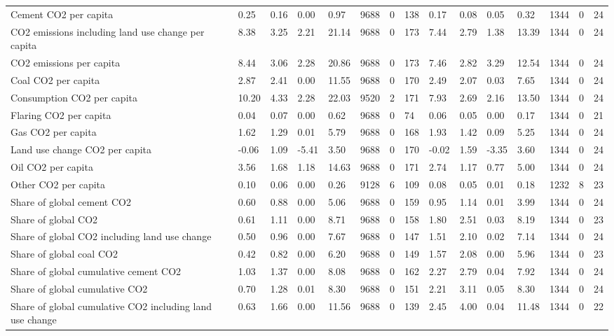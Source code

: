 \begin{longtable}{lllllllllllllll}
Cement CO2 per capita & 0.25 & 0.16 & 0.00 & 0.97 & 9688 & 0 & 138 & 0.17 & 0.08 & 0.05 & 0.32 & 1344 & 0 & 24\\
CO2 emissions including land use change per capita & 8.38 & 3.25 & 2.21 & 21.14 & 9688 & 0 & 173 & 7.44 & 2.79 & 1.38 & 13.39 & 1344 & 0 & 24\\
CO2 emissions per capita & 8.44 & 3.06 & 2.28 & 20.86 & 9688 & 0 & 173 & 7.46 & 2.82 & 3.29 & 12.54 & 1344 & 0 & 24\\
Coal CO2 per capita & 2.87 & 2.41 & 0.00 & 11.55 & 9688 & 0 & 170 & 2.49 & 2.07 & 0.03 & 7.65 & 1344 & 0 & 24\\
\addlinespace
Consumption CO2 per capita & 10.20 & 4.33 & 2.28 & 22.03 & 9520 & 2 & 171 & 7.93 & 2.69 & 2.16 & 13.50 & 1344 & 0 & 24\\
Flaring CO2 per capita & 0.04 & 0.07 & 0.00 & 0.62 & 9688 & 0 & 74 & 0.06 & 0.05 & 0.00 & 0.17 & 1344 & 0 & 21\\
Gas CO2 per capita & 1.62 & 1.29 & 0.01 & 5.79 & 9688 & 0 & 168 & 1.93 & 1.42 & 0.09 & 5.25 & 1344 & 0 & 24\\
Land use change CO2 per capita & -0.06 & 1.09 & -5.41 & 3.50 & 9688 & 0 & 170 & -0.02 & 1.59 & -3.35 & 3.60 & 1344 & 0 & 24\\
Oil CO2 per capita & 3.56 & 1.68 & 1.18 & 14.63 & 9688 & 0 & 171 & 2.74 & 1.17 & 0.77 & 5.00 & 1344 & 0 & 24\\
\addlinespace
Other CO2 per capita & 0.10 & 0.06 & 0.00 & 0.26 & 9128 & 6 & 109 & 0.08 & 0.05 & 0.01 & 0.18 & 1232 & 8 & 23\\
Share of global cement CO2 & 0.60 & 0.88 & 0.00 & 5.06 & 9688 & 0 & 159 & 0.95 & 1.14 & 0.01 & 3.99 & 1344 & 0 & 24\\
Share of global CO2 & 0.61 & 1.11 & 0.00 & 8.71 & 9688 & 0 & 158 & 1.80 & 2.51 & 0.03 & 8.19 & 1344 & 0 & 23\\
Share of global CO2 including land use change & 0.50 & 0.96 & 0.00 & 7.67 & 9688 & 0 & 147 & 1.51 & 2.10 & 0.02 & 7.14 & 1344 & 0 & 24\\
Share of global coal CO2 & 0.42 & 0.82 & 0.00 & 6.20 & 9688 & 0 & 149 & 1.57 & 2.08 & 0.00 & 5.96 & 1344 & 0 & 23\\
\addlinespace
Share of global cumulative cement CO2 & 1.03 & 1.37 & 0.00 & 8.08 & 9688 & 0 & 162 & 2.27 & 2.79 & 0.04 & 7.92 & 1344 & 0 & 24\\
Share of global cumulative CO2 & 0.70 & 1.28 & 0.01 & 8.30 & 9688 & 0 & 151 & 2.21 & 3.11 & 0.05 & 8.30 & 1344 & 0 & 24\\
Share of global cumulative CO2 including land use change & 0.63 & 1.66 & 0.00 & 11.56 & 9688 & 0 & 139 & 2.45 & 4.00 & 0.04 & 11.48 & 1344 & 0 & 22\\

\end{longtable}

